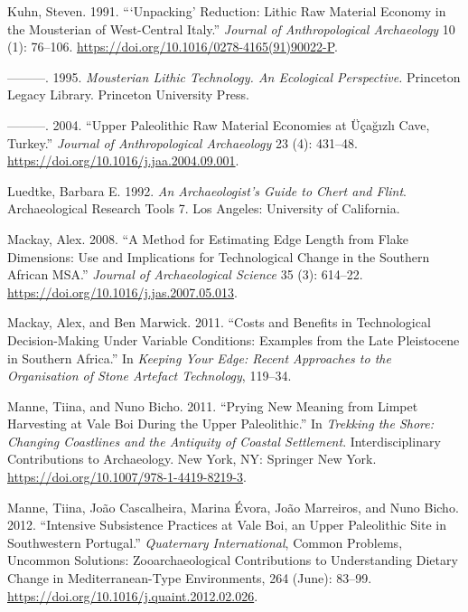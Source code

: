\documentclass[
  a4paper,
  DIV=11,
  numbers=noendperiod]{scrreprt}
\newlength{\cslhangindent}
\newenvironment{CSLReferences}[2] %
 {\begin{list}{}{%
  \setlength{\itemindent}{0pt}
  \setlength{\leftmargin}{0pt}
  \setlength{\parsep}{0pt}
  \ifodd #1
   \setlength{\leftmargin}{\cslhangindent}
   \setlength{\itemindent}{-1\cslhangindent}
  \fi
  \setlength{\itemsep}{#2\baselineskip}}}
 {\end{list}}
\begin{document}
\begin{CSLReferences}{1}{0}
Kuhn, Steven. 1991. {``{`{Unpacking}'} Reduction: {Lithic} Raw Material
Economy in the Mousterian of West-Central {Italy}.''} \emph{Journal of
Anthropological Archaeology} 10 (1): 76--106.
\url{https://doi.org/10.1016/0278-4165(91)90022-P}.

---------. 1995. \emph{Mousterian {Lithic Technology}. {An} Ecological
Perspective.} Princeton {Legacy Library}. Princeton University Press.

---------. 2004. {``Upper {Paleolithic} Raw Material Economies at
{{Ü}{ç}a{ğ}{ı}zl{ı}} Cave, {Turkey}.''} \emph{Journal of Anthropological
Archaeology} 23 (4): 431--48.
\url{https://doi.org/10.1016/j.jaa.2004.09.001}.

Luedtke, Barbara E. 1992. \emph{An {Archaeologist}'s {Guide} to {Chert}
and {Flint}}. Archaeological {Research Tools} 7. Los Angeles: University
of California.

Mackay, Alex. 2008. {``A Method for Estimating Edge Length from Flake
Dimensions: Use and Implications for Technological Change in the
Southern {African MSA}.''} \emph{Journal of Archaeological Science} 35
(3): 614--22. \url{https://doi.org/10.1016/j.jas.2007.05.013}.

Mackay, Alex, and Ben Marwick. 2011. {``Costs and Benefits in
Technological Decision-Making Under Variable Conditions: Examples from
the Late {Pleistocene} in Southern {Africa}.''} In \emph{Keeping {Your
Edge}: {Recent Approaches} to the {Organisation} of {Stone Artefact
Technology}}, 119--34.

Manne, Tiina, and Nuno Bicho. 2011. {``Prying {New Meaning} from {Limpet
Harvesting} at {Vale Boi During} the {Upper Paleolithic}.''} In
\emph{Trekking the {Shore}: {Changing Coastlines} and the {Antiquity} of
{Coastal Settlement}}. Interdisciplinary {Contributions} to
{Archaeology}. New York, NY: Springer New York.
\url{https://doi.org/10.1007/978-1-4419-8219-3}.

Manne, Tiina, João Cascalheira, Marina Évora, João Marreiros, and Nuno
Bicho. 2012. {``Intensive Subsistence Practices at {Vale Boi}, an {Upper
Paleolithic} Site in Southwestern {Portugal}.''} \emph{Quaternary
International}, Common {Problems}, {Uncommon Solutions}:
{Zooarchaeological Contributions} to {Understanding Dietary Change} in
{Mediterranean-Type Environments}, 264 (June): 83--99.
\url{https://doi.org/10.1016/j.quaint.2012.02.026}.


\end{CSLReferences}
\end{document}
